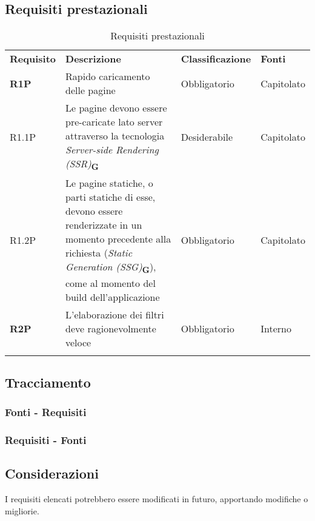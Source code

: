 \subsection{Requisiti prestazionali}
\begin{center}
    \centering
    \renewcommand{\arraystretch}{1.8}
    \label{tab:RequisitiPrestazionali}
    \begin{longtable}[!h]{p{50px} p{200px} p{100px} p{50px}}
        \rowcolor{logo!70} \textbf{Requisito} & \textbf{Descrizione}                                                                                                                                                                             & \textbf{Classificazione} & \textbf{Fonti} \\
        \textbf{R1P}                          & Rapido caricamento delle pagine                                                                                                                                                                  & Obbligatorio             & Capitolato     \\
        R1.1P                                 & Le pagine devono essere pre-caricate lato server attraverso la tecnologia \textit{Server-side Rendering (SSR)}\textsubscript{\textbf{G}}                                                                                   & Desiderabile             & Capitolato     \\
        R1.2P                                 & Le pagine statiche, o parti statiche di esse, devono essere renderizzate in un momento precedente alla richiesta (\textit{Static Generation (SSG)}\textsubscript{\textbf{G}}), come al momento del build dell'applicazione & Obbligatorio             & Capitolato     \\
        \textbf{R2P}                          & L'elaborazione dei filtri deve ragionevolmente veloce                                                                                                                                       & Obbligatorio             & Interno        \\
        \rowcolor{white}\caption{Requisiti prestazionali}
    \end{longtable}
\end{center}

\newpage
\subsection{Tracciamento}
\subsubsection{Fonti - Requisiti}


\newpage
\subsubsection{Requisiti - Fonti}


\subsection{Considerazioni}
I requisiti elencati potrebbero essere modificati in futuro, apportando modifiche o migliorie. 